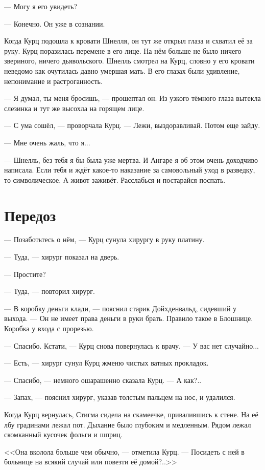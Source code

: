 --- Могу я его увидеть?

--- Конечно.
Он уже в сознании.

Когда Курц подошла к кровати Шнелля, он тут же открыл глаза и схватил её за руку.
Курц поразилась перемене в его лице.
На нём больше не было ничего звериного, ничего дьявольского.
Шнелль смотрел на Курц, словно у его кровати неведомо как очутилась давно умершая мать.
В его глазах были удивление, непонимание и растроганность.

--- Я думал, ты меня бросишь, --- прошептал он.
Из узкого тёмного глаза вытекла слезинка и тут же высохла на горящем лице.

--- С ума сошёл, --- проворчала Курц.
--- Лежи, выздоравливай.
Потом еще зайду.

--- Мне очень жаль, что я...

--- Шнелль, без тебя я бы была уже мертва.
И Ангаре я об этом очень доходчиво написала.
Если тебя и ждёт какое-то наказание за самовольный уход в разведку, то символическое.
А живот заживёт.
Расслабься и постарайся поспать.

\section{Передоз}

--- Позаботьтесь о нём, --- Курц сунула хирургу в руку платину.

--- Туда, --- хирург показал на дверь.

--- Простите?

--- Туда, --- повторил хирург.

--- В коробку деньги клади, --- пояснил старик Дойхденвальд, сидевший у выхода.
--- Он не имеет права деньги в руки брать.
Правило такое в Блошнице.
Коробка у входа с прорезью.

--- Спасибо.
Кстати, --- Курц снова повернулась к врачу.
--- У вас нет случайно...

--- Есть, --- хирург сунул Курц жменю чистых ватных прокладок.

--- Спасибо, --- немного ошарашенно сказала Курц.
--- А как?..

--- Запах, --- пояснил хирург, указав толстым пальцем на нос, и удалился.

Когда Курц вернулась, Стигма сидела на скамеечке, привалившись к стене.
На её лбу градинами лежал пот.
Дыхание было глубоким и медленным.
Рядом лежал скомканный кусочек фольги и шприц.

<<Она вколола больше чем обычно, --- отметила Курц.
--- Посидеть с ней в больнице на всякий случай или повезти её домой?..>>

